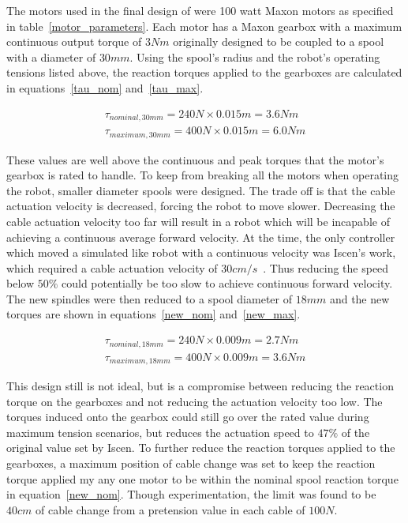 \begin{appendices}
The motors used in the final design of \SB{} were 100 watt Maxon motors as specified in table~\ref{motor_parameters}.
Each motor has a Maxon gearbox with a maximum continuous output torque of \(3Nm\) originally designed to be coupled to a spool with a diameter of \(30mm\).
Using the spool's radius and the robot's operating tensions listed above, the reaction torques applied to the gearboxes are calculated in equations~\ref{tau_nom} and~\ref{tau_max}.

\begin{align}
\tau_{nominal, 30mm} = 240N \times 0.015m = 3.6Nm \label{tau_nom} \\
\tau_{maximum, 30mm} = 400N \times 0.015m = 6.0Nm \label{tau_max}
\end{align}

These values are well above the continuous and peak torques that the motor's gearbox is rated to handle.
To keep from breaking all the motors when operating the robot, smaller diameter spools were designed. 
The trade off is that the cable actuation velocity is decreased, forcing the robot to move slower.
Decreasing the cable actuation velocity too far will result in a robot which will be incapable of achieving a continuous average forward velocity.
At the time, the only controller which moved a simulated \SB{} like robot with a continuous velocity was Iscen's work, which required a cable actuation velocity of \(30 cm/s\)~\cite{iscen2014flop}.
Thus reducing the speed below \(50\%\) could potentially be too slow to achieve continuous forward velocity.
The new spindles were then reduced to a spool diameter of \(18mm\) and the new torques are shown in equations~\ref{new_nom} and~\ref{new_max}.

\begin{align}
\tau_{nominal, 18mm} = 240N \times 0.009m = 2.7Nm \label{new_nom} \\
\tau_{maximum, 18mm} = 400N \times 0.009m = 3.6Nm \label{new_max}
\end{align}

This design still is not ideal, but is a compromise between reducing the reaction torque on the gearboxes and not reducing the actuation velocity too low.
The torques induced onto the gearbox could still go over the rated value during maximum tension scenarios, but reduces the actuation speed to \(47\%\) of the original value set by Iscen.
To further reduce the reaction torques applied to the gearboxes, a maximum position of cable change was set to keep the reaction torque applied my any one motor to be within the nominal spool reaction torque in equation~\ref{new_nom}.
Though experimentation, the limit was found to be \(40cm\) of cable change from a pretension value in each cable of \(100N\).


\end{appendices}
